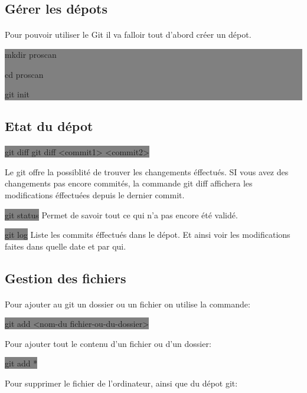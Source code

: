 \documentclass[11pt,a4paper,titlepage, oneside]{article}
\begin{document}
	\subsection{{\color{red} Gérer les dépots}}
		\paragraph{}
			Pour pouvoir utiliser le Git il va falloir tout d'abord créer un dépot.
			
			\colorbox{gray}{mkdir proscan

				cd proscan
	
				git init}
	
	\subsection{{\color{red} Etat du dépot}}	
		\paragraph{}
			\colorbox{gray}{git diff git diff <commit1> <commit2>}

			Le git offre la possiblité de trouver les changements éffectués. SI vous avez des changements pas encore commités, la commande git diff affichera les modifications éffectuées depuis le dernier commit.

			\colorbox{gray}{git status} Permet de savoir tout ce qui n'a pas encore été validé.
	
			\colorbox{gray}{git log} Liste les commits éffectués dans le dépot. Et ainsi voir les modifications faites dans quelle date et par qui.

	\subsection{{\color{red} Gestion des fichiers}}

		\paragraph{}
			Pour ajouter au git un dossier ou un fichier on utilise la commande:

			\colorbox{gray}{git add <nom-du fichier-ou-du-dossier>}

			Pour ajouter tout le contenu d'un fichier ou d'un dossier:

			\colorbox{gray}{git add *}

			Pour supprimer le fichier de l'ordinateur, ainsi que du dépot git:		
			
\end{document}
